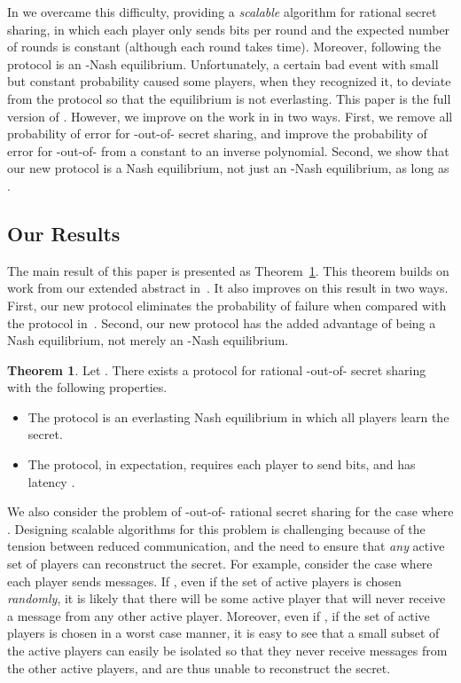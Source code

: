 \documentclass[12pt]{article}
\theoremstyle{definition}
\newtheorem{theorem}{Theorem}
\begin{document}
In \cite{RSSpodc11} we overcame this difficulty, providing a
\emph{scalable} algorithm for rational secret sharing, in which each
player only sends  bits per round and the expected number of
rounds is constant (although each round takes 
time). Moreover, following the protocol is an -Nash
equilibrium. Unfortunately, a certain bad event with small but
constant probability caused some players, when they recognized it, to
deviate from the protocol so that the equilibrium is not everlasting.
This paper is the full version of \cite{RSSpodc11}.  However, we
improve on the work in \cite{RSSpodc11} in two ways.  First, we remove
all probability of error for -out-of- secret sharing, and
improve the probability of error for -out-of- from a constant to
an inverse polynomial.  Second, we show that our new protocol is a
Nash equilibrium, not just an -Nash equilibrium, as long as
.

\subsection{Our Results}

The main result of this paper is presented as Theorem~\ref{thm:main}.
This theorem builds on work from our extended abstract
in~\cite{RSSpodc11}.  It also improves on this result in two ways.
First, our new protocol eliminates the probability of failure when
compared with the protocol in~\cite{RSSpodc11}.  Second, our new
protocol has the added advantage of being a Nash equilibrium, not
merely an -Nash equilibrium.
 
\begin{theorem}\label{thm:main}
Let . There exists a protocol for rational -out-of-
secret sharing with the following properties.
\begin{itemize}
\item The protocol is an everlasting Nash equilibrium in which all
  players learn the secret.
\item The protocol, in expectation, requires each player to send
   bits, and has latency .
\end{itemize}
\label{thm:nofn}
\end{theorem}

We also consider the problem of -out-of- rational secret sharing
for the case where .  Designing scalable algorithms for this
problem is challenging because of the tension between reduced
communication, and the need to ensure that \emph{any} active set of
 players can reconstruct the secret.  For example, consider the
case where each player sends  messages.  If , even if the set of active players is chosen \emph{randomly}, it
is likely that there will be some active player that will never
receive a message from any other active player.  Moreover, even if
, if the set of active players is chosen in a worst case
manner, it is easy to see that a small subset of the active players
can easily be isolated so that they never receive messages from the
other active players, and are thus unable to reconstruct the secret.
\end{document}
